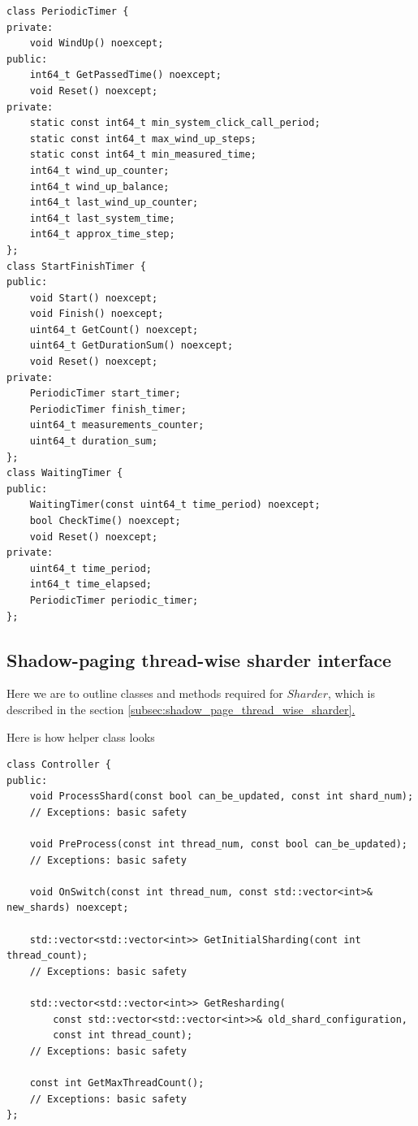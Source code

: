 \documentclass{article}
\newcommand*{\fullref}[1]{\hyperref[{#1}]{\ref*{#1}. \nameref*{#1}}}
\begin{document}
\begin{lstlisting}
class PeriodicTimer {
private:
	void WindUp() noexcept;
public:
	int64_t GetPassedTime() noexcept;
	void Reset() noexcept;
private:
	static const int64_t min_system_click_call_period;
	static const int64_t max_wind_up_steps;
	static const int64_t min_measured_time;
	int64_t wind_up_counter;
	int64_t wind_up_balance;
	int64_t last_wind_up_counter;
	int64_t last_system_time;
	int64_t approx_time_step;
};
class StartFinishTimer {
public:
	void Start() noexcept;
	void Finish() noexcept;
	uint64_t GetCount() noexcept;
	uint64_t GetDurationSum() noexcept;
	void Reset() noexcept;
private:
	PeriodicTimer start_timer;
	PeriodicTimer finish_timer;
	uint64_t measurements_counter;
	uint64_t duration_sum;
};
class WaitingTimer {
public:
	WaitingTimer(const uint64_t time_period) noexcept;
	bool CheckTime() noexcept;
	void Reset() noexcept;
private:
	uint64_t time_period;
	int64_t time_elapsed;
	PeriodicTimer periodic_timer;
};
\end{lstlisting}
\subsection{Shadow-paging thread-wise sharder interface}
Here we are to outline classes and methods required for $Sharder$, which is described in the section \fullref{subsec:shadow_page_thread_wise_sharder}

Here is how helper class looks
\begin{lstlisting}
class Controller {
public:
	void ProcessShard(const bool can_be_updated, const int shard_num);
	// Exceptions: basic safety

	void PreProcess(const int thread_num, const bool can_be_updated);
	// Exceptions: basic safety

	void OnSwitch(const int thread_num, const std::vector<int>& new_shards) noexcept;

	std::vector<std::vector<int>> GetInitialSharding(cont int thread_count);
	// Exceptions: basic safety

	std::vector<std::vector<int>> GetResharding(
		const std::vector<std::vector<int>>& old_shard_configuration,
		const int thread_count);
	// Exceptions: basic safety

	const int GetMaxThreadCount();
	// Exceptions: basic safety
};
\end{lstlisting}
\end{document}
